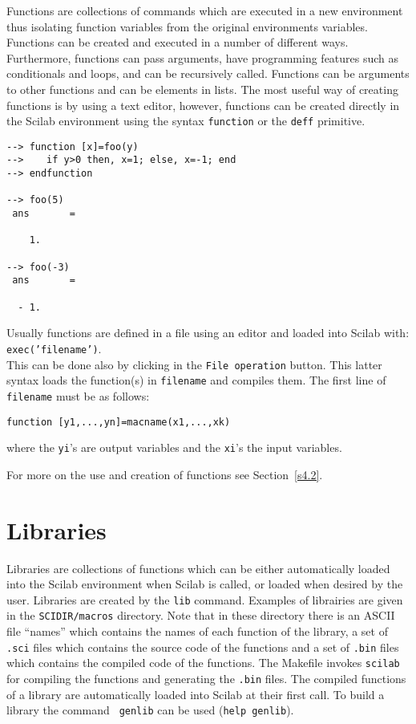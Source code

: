  Functions are collections of commands which are executed in a
new environment thus isolating function variables from the original
environments variables.  Functions
can be created and executed in a number of different ways.
Furthermore, functions can pass arguments, have programming features
such as conditionals and loops, and can be recursively called.
Functions can be arguments
to other functions and can be elements in lists.  The most useful
way of creating functions is by using a text editor, however, functions
can be created directly in the Scilab environment using the syntax
{\tt function} or the
{\tt deff} primitive.
\begin{verbatim}
--> function [x]=foo(y)
-->    if y>0 then, x=1; else, x=-1; end
--> endfunction
 
--> foo(5)
 ans       =
 
    1.  
 
--> foo(-3)
 ans       =
 
  - 1.  
\end{verbatim}
Usually functions are defined in a file using an editor and loaded
into Scilab with:\\
{\tt exec('filename')}.\\
This can be done also by clicking in the {\tt File operation} button.
This latter syntax loads the function(s) in {\tt filename} and compiles
them.
The first line of {\tt filename} must be as follows:
\begin{verbatim}
function [y1,...,yn]=macname(x1,...,xk)
\end{verbatim}
where the {\tt yi}'s are output variables and the {\tt xi}'s the
input variables.

For more on the use and creation of functions see Section~\ref{s4.2}.

\section{Libraries}
\label{s2.7}

	Libraries are collections of functions which can be either 
automatically loaded into the Scilab environment when
Scilab is called, or loaded when desired by the user.  
Libraries are created by the {\tt lib} command. Examples of librairies
are given in the {\tt SCIDIR/macros} directory. Note that in these
directory there is an ASCII file ``names'' which contains the names
of each function of the library, a set of {\tt .sci} files which
contains the source code of the functions and a set of {\tt .bin} files
which contains the compiled code of the functions. The Makefile invokes
{\tt scilab} for compiling the functions and generating the {\tt .bin}
files. The compiled functions of a library are automatically loaded 
into Scilab at their first call. To build a library the command {\tt
genlib} can be used (\verb!help genlib!).


